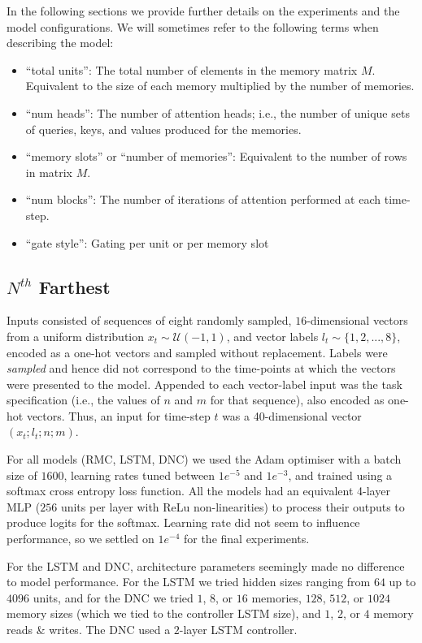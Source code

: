 \documentclass{article}
\begin{document}
In the following sections we provide further details on the experiments and the model configurations. We will sometimes refer to the following terms when describing the model: 
\begin{itemize}
    \item ``total units'': The total number of elements in the memory matrix $M$. Equivalent to the size of each memory multiplied by the number of memories.
    \item ``num heads'': The number of attention heads; i.e., the number of unique sets of queries, keys, and values produced for the memories. 
    \item ``memory slots'' or ``number of memories'': Equivalent to the number of rows in matrix $M$.
    \item ``num blocks'': The number of iterations of attention performed at each time-step.
    \item ``gate style'': Gating per unit or per memory slot
\end{itemize}


\subsection{$N^{th}$ Farthest}
Inputs consisted of sequences of eight randomly sampled, $16$-dimensional vectors from a uniform distribution $x_t \sim \mathcal{U}(-1, 1)$, and vector labels $l_t \sim \{1, 2, ..., 8 \}$, encoded as a one-hot vectors and sampled without replacement. Labels were \textit{sampled} and hence did not correspond to the time-points at which the vectors were presented to the model. Appended to each vector-label input was the task specification (i.e., the values of $n$ and $m$ for that sequence), also encoded as one-hot vectors. Thus, an input for time-step $t$ was a 40-dimensional vector $(x_t; l_t; n; m)$.

For all models (RMC, LSTM, DNC) we used the Adam optimiser \cite{kingma2014adam} with a batch size of $1600$, learning rates tuned between $1e^{-5}$ and $1e^{-3}$, and trained using a softmax cross entropy loss function. All the models had an equivalent 4-layer MLP ($256$ units per layer with ReLu non-linearities) to process their outputs to produce logits for the softmax. Learning rate did not seem to influence performance, so we settled on $1e^{-4}$ for the final experiments.

For the LSTM and DNC, architecture parameters seemingly made no difference to model performance. For the LSTM we tried hidden sizes ranging from $64$ up to $4096$ units, and for the DNC we tried $1$, $8$, or $16$ memories, $128$, $512$, or $1024$ memory sizes (which we tied to the controller LSTM size), and $1$, $2$, or $4$ memory reads \& writes. The DNC used a $2$-layer LSTM controller. 
\end{document}
